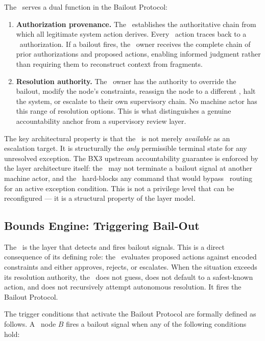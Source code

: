 The \purpose\ serves a dual function in the Bailout Protocol:

\begin{enumerate}
\item \textbf{Authorization provenance.} The \purpose\ establishes the authoritative chain from which all legitimate system action derives. Every \bounds\ action traces back to a \purpose\ authorization. If a bailout fires, the \purpose\ owner receives the complete chain of prior authorizations and proposed actions, enabling informed judgment rather than requiring them to reconstruct context from fragments.
\item \textbf{Resolution authority.} The \purpose\ owner has the authority to override the bailout, modify the node's constraints, reassign the node to a different \bounds, halt the system, or escalate to their own supervisory chain. No machine actor has this range of resolution options. This is what distinguishes a genuine accountability anchor from a supervisory review layer.
\end{enumerate}

The key architectural property is that the \purpose\ is not merely \textit{available} as an escalation target. It is structurally the \textit{only} permissible terminal state for any unresolved exception. The BX3 upstream accountability guarantee is enforced by the layer architecture itself: the \bounds\ may not terminate a bailout signal at another machine actor, and the \fact\ hard-blocks any command that would bypass \purpose\ routing for an active exception condition. This is not a privilege level that can be reconfigured --- it is a structural property of the layer model.

\subsection{Bounds Engine: Triggering Bail-Out}
\label{sec:bounds-trigger}

The \bounds\ is the layer that detects and fires bailout signals. This is a direct consequence of its defining role: the \bounds\ evaluates proposed actions against encoded constraints and either approves, rejects, or escalates. When the situation exceeds its resolution authority, the \bounds\ does not guess, does not default to a safest-known action, and does not recursively attempt autonomous resolution. It fires the Bailout Protocol.

The trigger conditions that activate the Bailout Protocol are formally defined as follows. A \bounds\ node $B$ fires a bailout signal when any of the following conditions hold:

